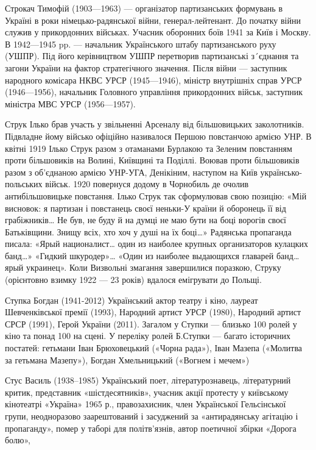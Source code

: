 Строкач Тимофій (1903—1963) — організатор партизанських формувань в Україні в роки німецько-радянської війни, генерал-лейтенант. До початку війни служив у прикордонних військах. Учасник оборонних боїв 1941 за Київ і Москву. В 1942—1945 pp. — начальник Українського штабу партизанського руху (УШПР). Під його керівництвом УШПР перетворив партизанські з´єднання та загони України на фактор стратегічного значення. Після війни — заступник народного комісара НКВС УРСР (1945—1946), міністр внутрішніх справ УРСР (1946—1956), начальник Головного управління прикордонних військ, заступник міністра МВС УРСР (1956—1957).

Струк Ілько   брав участь у звільненні Арсеналу від більшовицьких заколотників. Підвладне йому військо офіційно називалося Першою повстанчою армією УНР. В квітні 1919 Ілько Струк разом з отаманами Бурлакою та Зеленим  повстанням проти більшовиків на Волині, Київщині та Поділлі.   Воював проти більшовиків разом з об'єднаною армією УНР-УГА, Денікіним, наступом на Київ українсько-польських військ. 1920 повернуся додому в Чорнобиль де очолив антибільшовицьке повстання. Ілько Струк так сформулював свою позицію: «Мій висновок: я партизан і повстанець своєї неньки-У країни й оборонець її від грабіжників… Не був, не буду й на думці не маю бути на боці ворогів своєї Батьківщини. Знищу всіх, хто хоч у душі на їх боці…»  Радянська пропаганда писала: «Ярый националист… один из наиболее крупных организаторов кулацких банд…» «Гидкий шкуродер»… «Один из наиболее выдающихся главарей банд… ярый украинец». Коли Визвольні змагання завершилися поразкою, Струку (орієнтовно взимку 1922 — 23 років) вдалося емігрувати до Польщі. 

Ступка Богдан (1941-2012) Український актор театру і кіно, лауреат Шевченківської премії (1993), Народний артист УРСР (1980), Народний артист СРСР (1991), Герой України (2011). Загалом у Ступки — близько 100 ролей у кіно та понад 100 на сцені. У переліку ролей Б.Ступки — багато історичних постатей: гетьмани Іван Брюховецький («Чорна рада»), Іван Мазепа («Молитва за гетьмана Мазепу»), Богдан Хмельницький («Вогнем і мечем»)

Стус Василь (1938–1985) Український поет, літературознавець, літературний критик, представник «шістдесятників», учасник акції протесту у київському кінотеатрі «Україна» 1965 р., правозахисник, член Української Гельсінської групи, неодноразово заарештований і засуджений за «антирадянську агітацію і пропаганду», помер у таборі для політв’язнів, автор поетичної збірки «Дорога болю», 

